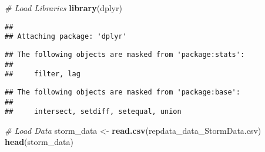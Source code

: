 \documentclass[
]{article}
\newenvironment{Shaded}{\begin{snugshade}}{\end{snugshade}}
\newcommand{\CommentTok}[1]{\textcolor[rgb]{0.56,0.35,0.01}{\textit{#1}}}
\newcommand{\FunctionTok}[1]{\textcolor[rgb]{0.13,0.29,0.53}{\textbf{#1}}}
\newcommand{\NormalTok}[1]{#1}
\newcommand{\OtherTok}[1]{\textcolor[rgb]{0.56,0.35,0.01}{#1}}
\newcommand{\StringTok}[1]{\textcolor[rgb]{0.31,0.60,0.02}{#1}}
\begin{document}
\begin{Shaded}
\begin{Highlighting}[]
\CommentTok{\# Load Libraries}
\FunctionTok{library}\NormalTok{(dplyr)}
\end{Highlighting}
\end{Shaded}

\begin{verbatim}
## 
## Attaching package: 'dplyr'
\end{verbatim}

\begin{verbatim}
## The following objects are masked from 'package:stats':
## 
##     filter, lag
\end{verbatim}

\begin{verbatim}
## The following objects are masked from 'package:base':
## 
##     intersect, setdiff, setequal, union
\end{verbatim}

\begin{Shaded}
\begin{Highlighting}[]
\CommentTok{\# Load Data}
\NormalTok{storm\_data }\OtherTok{\textless{}{-}} \FunctionTok{read.csv}\NormalTok{(}\StringTok{\textquotesingle{}repdata\_data\_StormData.csv\textquotesingle{}}\NormalTok{)}
\FunctionTok{head}\NormalTok{(storm\_data)}
\end{Highlighting}
\end{Shaded}
\end{document}
